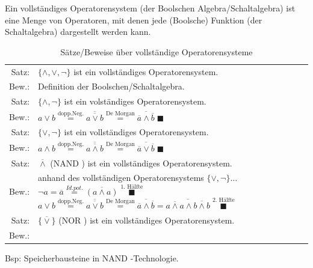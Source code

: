 \documentclass[10pt,a4paper]{scrartcl}
\begin{document}
\begin{Theorem}{}{}
	Ein vollständiges Operatorensystem (der Boolschen Algebra/Schaltalgebra) ist eine Menge von Operatoren, mit denen jede (Boolsche) Funktion (der Schaltalgebra) dargestellt werden kann.
\end{Theorem}

\begin{table}
	\centering
	\begin{tabular}{rp{10cm}}
	Satz: & $ \{\wedge, \vee, \neg\} $ ist ein vollständiges Operatorensystem.\\
	Bew.:& Definition der Boolschen/Schaltalgebra.\\ \hline
	Satz: & $ \{\wedge, \neg\} $ ist ein volständiges Operatorensystem.\\
	Bew.:& $ a \vee b \overset{\text{dopp.Neg.}}{=} \overline{\overline{a\vee b}} \overset{\text{De Morgan}}{=} \overline{\overline{a} \wedge \overline{b}}\; \blacksquare$\\ \hline
	Satz: & $ \{\vee, \neg\} $ ist ein vollständiges Operatorensystem.\\
	Bew.:& $ a \wedge b \overset{\text{dopp.Neg.}}{=} \overline{\overline{a \wedge b}} \overset{\text{De Morgan}}{=} \overline{\overline{a} \vee \overline{b}}\; \blacksquare $\\ \hline
	Satz: & $ \overline{\wedge} $ (\glqq NAND \grqq) ist ein vollständiges Operatorensystem.\\
	Bew.: & anhand des vollständigen Operatorensystems $ \{\vee, \neg\}\ldots $
	\newline $ \neg a = \overline{a} \overset{Id.pot.}{=} \overline{(a \wedge a)} \;\overset{\text{1. Hälfte}}{\blacksquare}$
	\newline $ a \vee b \overset{\text{dopp.Neg.}}{=} \overline{\overline{a \vee b}} \overset{\text{De Morgan}}{=} \overline{\overline{a} \wedge \overline{b}} = \overline{\overline{a \wedge a} \wedge \overline{b \wedge b}} \;\overset{\text{2. Hälfte}}{\blacksquare}$\\ \hline
	Satz: & $ \{\overline{\vee}\} $ (\glqq NOR \grqq) ist ein vollständiges Operatorensystem.\\
	Bew.: & $  $\\ %
\end{tabular}
\caption{Sätze/Beweise über vollständige Operatorensysteme}
\end{table}

Bsp: Speicherbausteine in \glqq NAND \grqq-Technologie.\\
\end{document}
